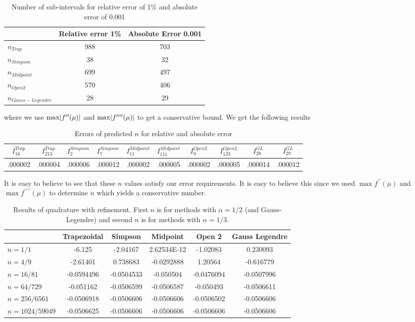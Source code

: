 \documentclass[12pt]{article}
\DeclarePairedDelimiter \abs{\lvert}{\rvert}%
\theoremstyle{remark}
\begin{document}
\begin{table}[H]
	\centering
	\begin{tabular}{||l|c|c||}
		\cline{2-3}
		\multicolumn{1}{c|}{} & Relative error 1\% & Absolute Error 0.001 \\ \hline \hline
		$n_{Trap}$ & 988 & 703 \\ \hline
		$n_{Simpson}$ & 38 & 32 \\ \hline
		$n_{Midpoint}$ & 699 & 497 \\ \hline
		$n_{Open2}$ & 570 & 406 \\ \hline
		$n_{Gauss-Legendre}$ & 28 & 29 \\ \hline
	\end{tabular}
	\caption{Number of sub-intervals for relative error of 1\% and absolute error of 0.001}
\end{table}
where we use $\max \abs{f^{\prime\prime}(\mu)}$ and $\max \abs{f^{\prime\prime\prime\prime}(\mu)}$ to get a conservative bound. We get the following results
\begin{table}[H]
	\centering
	\begin{tabular}{||c|c|c|c|c|c|c|c|c|c||}
		\hline
		$I_{16}^{Trap}$ & $I_{213}^{Trap}$ & $I_{2}^{Simpson}$ & $I_{7}^{Simpson}$ & $I_{11}^{Midpoint}$ & $I_{151}^{Midpoint}$ & $I_{9}^{Open2}$ & $I_{123}^{Open2}$ & $I_{28}^{GL}$ & $I_{29}^{GL}$ \\ \hline \hline
		.000002 & .000004 & .000006 & .000012 & .000002 & .000005 & .000002 & .000005 & .000014 & .000012 \\ \hline
	\end{tabular} 
	\caption{Errors of predicted $n$ for relative and absolute error}
\end{table}
It is easy to believe to see that these $n$ values satisfy our error requirements. It is easy to believe this since we used $\max f^{\prime\prime}(\mu)$ and $\max f^{\prime\prime\prime\prime}(\mu)$ to determine $n$ which yields a conservative number.
\begin{table}[H]
	\centering
	\begin{tabular}{||l|c|c|c|c|c||}
		\cline{2-6}
		\multicolumn{1}{c|}{} & Trapezoidal & Simpson & Midpoint & Open 2 & Gauss Legendre \\ \hline \hline
		$n=1/1$ & -6.125 & -2.04167 & 2.62534E-12 & -1.02083 & 0.230093 \\ \hline
		$n=4/9$ & -2.61401 & 0.738683 & -0.0292888 & 1.20564 & -0.616779 \\ \hline
		$n=16/81$ & -0.0594496 & -0.0504533 & -0.050504 & -0.0476094 & -0.0507996 \\ \hline
		$n=64/729$ & -0.051162& -0.0506599 & -0.0506587 & -0.050493 & -0.0506611 \\ \hline
		$n=256/6561$ & -0.0506918 & -0.0506606 & -0.0506606 & -0.0506502 & -0.0506606 \\ \hline
		$n=1024/59049$ & -0.0506625 & -0.0506606 & -0.0506606 & -0.0506606 & -0.0506606 \\ \hline
	\end{tabular}
	\caption{Results of quadrature with refinement. First $n$ is for methods with $\alpha = 1/2$ (and Gauss-Legendre) and second $n$ is for methods with $\alpha = 1/3$.}
\end{table}	 
\end{document}
